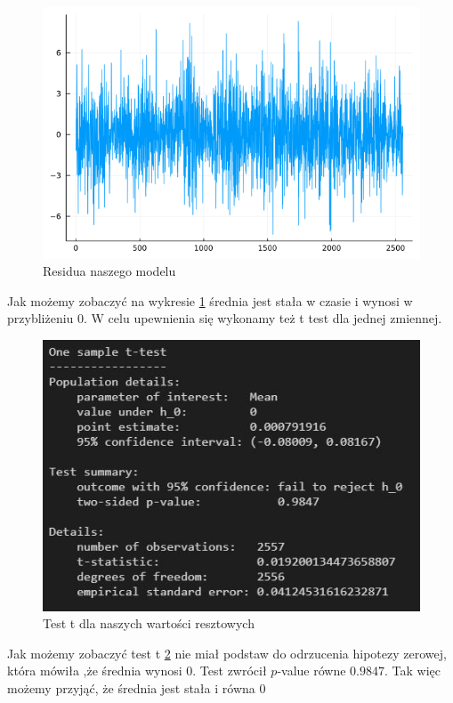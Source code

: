 \documentclass[12pt]{article}
\theoremstyle{exer}
\begin{document}
	\begin{figure}[H]
	\centering
	\includegraphics[width=3\columnwidth/4]{img/residua.png}
	\caption{Residua naszego modelu}
	\label{fig:residua}
\end{figure}
 Jak możemy zobaczyć na wykresie \ref{fig:residua} średnia jest stała w czasie i wynosi w przybliżeniu $0$. 
 W celu upewnienia się wykonamy też t test dla jednej zmiennej.
 	\begin{figure}[H]
 	\centering
 	\includegraphics[width=3\columnwidth/4]{img/t_test.png}
 	\caption{Test t dla naszych wartości resztowych}
 	\label{t_test}
 \end{figure}
Jak możemy zobaczyć test t \ref{t_test} nie miał podstaw do odrzucenia hipotezy zerowej, która mówiła ,że średnia wynosi $0$. Test zwrócił $p$-value równe $0.9847$.
Tak więc możemy przyjąć, że średnia jest stała i równa $0$
\end{document}
